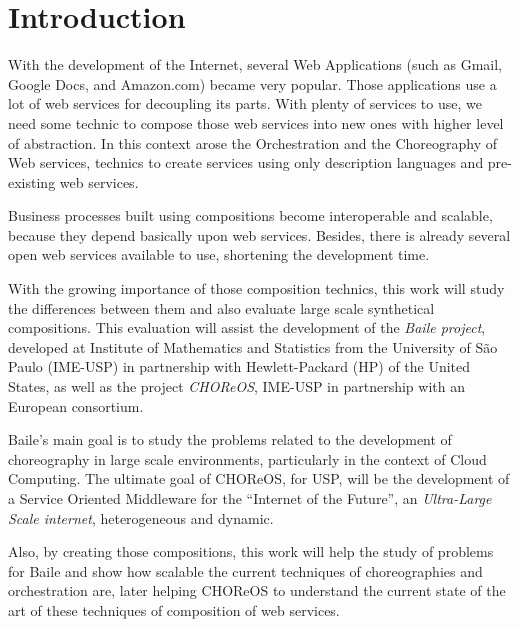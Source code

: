 \section{Introduction}

With the development of the Internet, several Web Applications (such as Gmail, Google Docs, and Amazon.com) became very popular. Those applications use a lot of web services for decoupling its parts. With plenty of services to use, we need some technic to compose those web services into new ones with higher level of abstraction. In this context arose the Orchestration and the Choreography of Web services, technics to create services using only description languages and pre-existing web services.

Business processes built using compositions become interoperable and scalable, because they depend basically upon web services. Besides, there is already several open web services available to use, shortening the development time.

With the growing importance of those composition technics, this work will study the differences between them and also evaluate large scale synthetical compositions. This evaluation will assist the development of the \emph{Baile project}, developed at Institute of Mathematics and Statistics from the University of São Paulo (IME-USP) in partnership with Hewlett-Packard (HP) of the United States, as well as the project \emph{CHOReOS}, IME-USP in partnership with an European consortium.

Baile’s main goal is to study the problems related to the development of choreography in large scale environments, particularly in the context of Cloud Computing. The ultimate goal of CHOReOS, for USP, will be the development of a Service Oriented Middleware for the ``Internet of the Future'', an \emph{Ultra-Large Scale internet}, heterogeneous and dynamic.

Also, by creating those compositions, this work will help the study of problems for Baile and show how scalable the current techniques of choreographies and orchestration are, later helping CHOReOS to understand the current state of the art of these techniques of composition of web services.